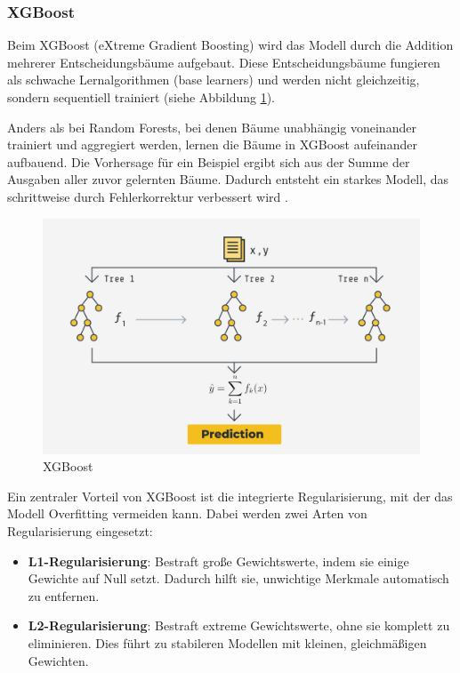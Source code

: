 \subsubsection{XGBoost}

Beim XGBoost (eXtreme Gradient Boosting) wird das Modell durch die Addition mehrerer Entscheidungsbäume aufgebaut. 
Diese Entscheidungsbäume fungieren als schwache Lernalgorithmen (base learners) und werden 
nicht gleichzeitig, sondern sequentiell trainiert (siehe Abbildung \ref{fig:xgboost}).

Anders als bei Random Forests, bei denen Bäume unabhängig voneinander trainiert und aggregiert werden, 
lernen die Bäume in XGBoost aufeinander aufbauend. Die Vorhersage für ein Beispiel ergibt sich aus der Summe der 
Ausgaben aller zuvor gelernten Bäume. Dadurch entsteht ein starkes Modell, das schrittweise durch Fehlerkorrektur 
verbessert wird \cite{petrovic2024,chen2016xgboost,aslam2022}.

\begin{figure}[htbp]
    \begin{center}
        \includegraphics[scale=0.25]{static/xgboost-pipeline.jpg}
        \caption[XGBoost]{\label{fig:xgboost} XGBoost\footnotemark}
    \end{center}
\end{figure}

Ein zentraler Vorteil von XGBoost ist die integrierte Regularisierung, mit der das Modell Overfitting vermeiden kann. 
Dabei werden zwei Arten von Regularisierung eingesetzt:

\begin{itemize}
    \item \textbf{L1-Regularisierung}: Bestraft große Gewichtswerte, indem sie einige Gewichte auf Null setzt. 
        Dadurch hilft sie, unwichtige Merkmale automatisch zu entfernen.
    \item \textbf{L2-Regularisierung}: Bestraft extreme Gewichtswerte, ohne sie komplett zu eliminieren. 
        Dies führt zu stabileren Modellen mit kleinen, gleichmäßigen Gewichten.
\end{itemize}

